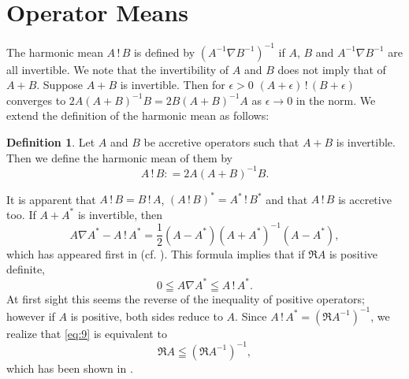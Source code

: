 \documentclass[reqno]{amsart}
\theoremstyle{definition}
\newtheorem{definition}[theorem]{Definition}
\theoremstyle{remark}
\begin{document}

\section{Operator Means}
The harmonic 
mean $A \, ! \, B$ is defined by $(A^{-1} \nabla B^{-1} )^{-1}$ if $A$, $B$ and $A^{-1} \nabla B^{-1}$ 
are all invertible. We note that the invertibility of $A$ and $B$ does not imply 
that of $A+B$. 
Suppose $A + B$ is invertible. Then for $\epsilon >0$ 
$ (A + \epsilon) \, ! \, (B + \epsilon)$ converges to $2 A (A + B)^{-1} B = 2B (A + B)^{-1} A$ as 
$\epsilon \to 0$ in the norm. We extend the definition of the harmonic mean 
as follows:
\begin{definition}\label{Def:5-1}
Let $A$ and $B$ be accretive operators such that $A + B$ is invertible. Then we define 
the harmonic mean of them by 
$$A \, ! \, B : = 2 A (A + B)^{-1} B.$$
\end{definition}
It is apparent that $A \, ! \, B =B \, ! \, A$,  $(A \, ! \, B)^* =  A^*  \, ! \, B^* $
 and that $A \, ! \, B$ is accretive too. 
If  $A + A^*$ is invertible, then 
$$ A \nabla A^* - A \, ! \, A^* =  \frac{1}{2} ( A - A^* )(A + A^* )^{-1}(A-A^*),  $$
which has appeared first in \cite{U-2019} (cf. \cite{U-2023, U-2024}). 
This formula implies that if  $\Re{A}$ is positive definite,  
\begin{equation}\label{eq:9}
0\leqq A \nabla A^* \leqq  A \, !\, A^*.
\end{equation}
At first sight this seems the reverse 
of the inequality of positive operators; however if $A$ is positive, both sides reduce  
to $A$. 
  Since 
$A\,! \,A^* = (\Re A^{-1})^{-1}$, 
we realize that \eqref{eq:9} is equivalent to  
$$\Re{A} \leqq  (\Re A^{-1})^{-1},$$
which has been shown in \cite{Mathias}.


\end{document}
